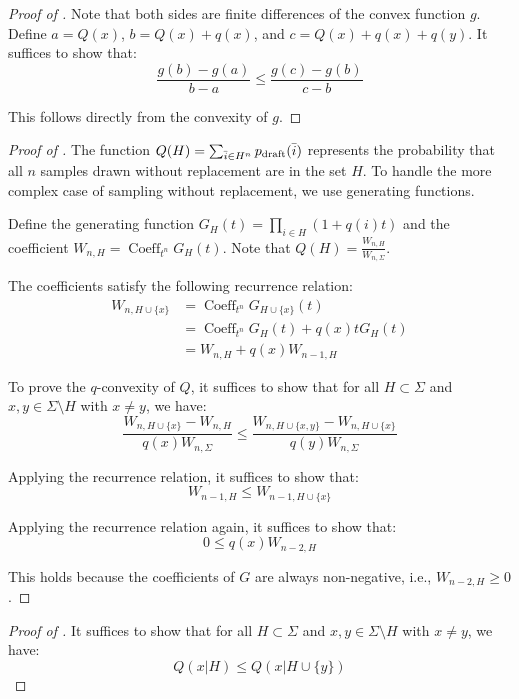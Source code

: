 \documentclass{article}
\begin{document}
\begin{proof}[Proof of ]
Note that both sides are finite differences of the convex function $g$. Define $a=Q(x)$, $b=Q(x)+q(x)$, and $c=Q(x)+q(x)+q(y)$. It suffices to show that:
\begin{equation}
\frac{g(b)-g(a)}{b-a}\leq\frac{g(c)-g(b)}{c-b}
\end{equation}

This follows directly from the convexity of $g$.
\end{proof} \begin{proof}[Proof of ]
The function $Q(H)=\sum_{\bar{i}\in H^n} p_{\operatorname{draft}}(\bar{i})$ represents the probability that all $n$ samples drawn without replacement are in the set $H$. To handle the more complex case of sampling without replacement, we use generating functions.

Define the generating function $G_H(t)=\prod_{i\in H}(1+q(i)t)$ and the coefficient $W_{n,H}=\operatorname{Coeff}_{t^n} G_H(t)$. Note that $Q(H)=\frac{W_{n,H}}{W_{n,\Sigma}}$.

The coefficients satisfy the following recurrence relation:
\begin{align}
W_{n,H\cup\{x\}}&=\operatorname{Coeff}_{t^n} G_{H\cup\{x\}}(t)\\
&=\operatorname{Coeff}_{t^n} G_{H}(t)+q(x)t G_{H}(t)\\
&=W_{n,H}+q(x)W_{n-1,H}
\end{align}

To prove the $q$-convexity of $Q$, it suffices to show that for all $H\subset \Sigma$ and $x,y\in \Sigma\setminus H$ with $x\neq y$, we have:
\begin{equation}
\frac{W_{n,H\cup\{x\}}-W_{n,H}}{q(x)W_{n,\Sigma}}\leq\frac{W_{n,H\cup\{x,y\}}-W_{n,H\cup\{x\}}}{q(y)W_{n,\Sigma}}
\end{equation}

Applying the recurrence relation, it suffices to show that:
\begin{equation}
W_{n-1,H}\leq W_{n-1,H\cup\{x\}}
\end{equation}

Applying the recurrence relation again, it suffices to show that:
\begin{equation}
0\leq q(x)W_{n-2,H}
\end{equation}

This holds because the coefficients of $G$ are always non-negative, i.e., $W_{n-2,H}\geq0$.
\end{proof} \begin{proof}[Proof of ]
It suffices to show that for all $H\subset \Sigma$ and $x,y\in \Sigma\setminus H$ with $x\neq y$, we have:
\begin{equation}
Q(x|H)\leq Q(x|H\cup\{y\})
\end{equation}


\end{proof}
\end{document}
